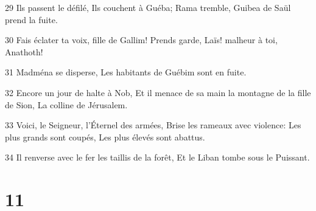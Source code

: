 \par 29 Ils passent le défilé, Ils couchent à Guéba; Rama tremble, Guibea de Saül prend la fuite.
\par 30 Fais éclater ta voix, fille de Gallim! Prends garde, Laïs! malheur à toi, Anathoth!
\par 31 Madména se disperse, Les habitants de Guébim sont en fuite.
\par 32 Encore un jour de halte à Nob, Et il menace de sa main la montagne de la fille de Sion, La colline de Jérusalem.
\par 33 Voici, le Seigneur, l'Éternel des armées, Brise les rameaux avec violence: Les plus grands sont coupés, Les plus élevés sont abattus.
\par 34 Il renverse avec le fer les taillis de la forêt, Et le Liban tombe sous le Puissant.

\chapter{11}

